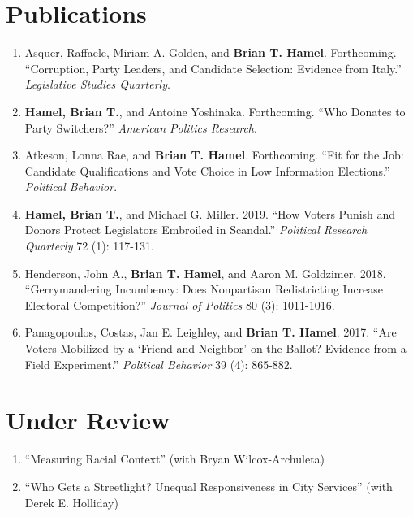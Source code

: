 \documentclass[12pt]{article}
\begin{document}
\section*{Publications}

\begin{enumerate}[topsep = 0pt, itemsep = 1ex, partopsep  = 1ex, parsep = 1ex]

	\item[] Asquer, Raffaele, Miriam A. Golden, and \textbf{Brian T. Hamel}. Forthcoming. ``Corruption, Party Leaders, and Candidate Selection: Evidence from Italy.'' \textit{Legislative Studies Quarterly}.

	\item[] \textbf{Hamel, Brian T.}, and Antoine Yoshinaka. Forthcoming. ``Who Donates to Party Switchers?'' \textit{American Politics Research}.
	
	\item[] Atkeson, Lonna Rae, and \textbf{Brian T. Hamel}. Forthcoming. ``Fit for the Job: Candidate Qualifications and Vote Choice in Low Information Elections.'' \textit{Political Behavior}.

	\item[] \textbf{Hamel, Brian T.}, and Michael G. Miller. 2019. ``How Voters Punish and Donors Protect Legislators Embroiled in Scandal.'' \textit{Political Research Quarterly} 72 (1): 117-131.

	\item[] Henderson, John A., \textbf{Brian T. Hamel}, and Aaron M. Goldzimer. 2018. ``Gerrymandering Incumbency: Does Nonpartisan Redistricting Increase Electoral Competition?'' \textit{Journal of Politics} 80 (3): 1011-1016.

	\item[] Panagopoulos, Costas, Jan E. Leighley, and \textbf{Brian T. Hamel}. 2017. ``Are Voters Mobilized by a `Friend-and-Neighbor' on the Ballot? Evidence from a Field Experiment.'' \textit{Political Behavior} 39 (4): 865-882.

\end{enumerate}

\section*{Under Review}

\begin{enumerate}[topsep = 0pt, itemsep = 1ex, partopsep  = 1ex, parsep = 1ex]

	\item[] ``Measuring Racial Context'' (with Bryan Wilcox-Archuleta)
	
	\item[] ``Who Gets a Streetlight? Unequal Responsiveness in City Services'' (with Derek E. Holliday)

\end{enumerate}
	
\end{document}
